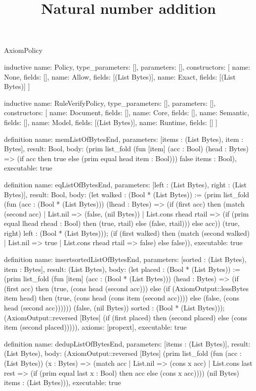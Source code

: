 \begin{lexlean}{AxiomPolicy}
\title{Natural number addition}
\begin{semanticmodule}
inductive{
  name: Policy,
  type_parameters: [],
  parameters: [],
  constructors: [
    {name: None, fields: []},
    {name: Allow, fields: [(List Bytes)]},
    {name: Exact, fields: [(List Bytes)]}
  ]
}

inductive{
  name: RuleVerifyPolicy,
  type_parameters: [],
  parameters: [],
  constructors: [
    {name: Document, fields: []},
    {name: Core, fields: []},
    {name: Semantic, fields: []},
    {name: Model, fields: [(List Bytes)]},
    {name: Runtime, fields: []}
  ]
}

definition{
  name: memListOfBytesEnd,
  parameters: [items : (List Bytes), item : Bytes],
  result: Bool,
  body: (prim list_fold (fun [item] (acc : Bool) (head : Bytes) => (if acc then true else (prim equal head item : Bool))) false items : Bool),
  executable: true
}

definition{
  name: eqListOfBytesEnd,
  parameters: [left : (List Bytes), right : (List Bytes)],
  result: Bool,
  body: (let walked : (Bool * (List Bytes)) := (prim list_fold (fun (acc : (Bool * (List Bytes))) (lhead : Bytes) => (if (first acc) then (match (second acc)
    | List.nil => (false, (nil Bytes))
    | List.cons rhead rtail => (if (prim equal lhead rhead : Bool) then (true, rtail) else (false, rtail))) else acc)) (true, right) left : (Bool * (List Bytes))); (if (first walked) then (match (second walked)
    | List.nil => true
    | List.cons rhead rtail => false) else false)),
  executable: true
}

definition{
  name: insertsortedListOfBytesEnd,
  parameters: [sorted : (List Bytes), item : Bytes],
  result: (List Bytes),
  body: (let placed : (Bool * (List Bytes)) := (prim list_fold (fun [item] (acc : (Bool * (List Bytes))) (head : Bytes) => (if (first acc) then (true, (cons head (second acc))) else (if (AxiomOutput::lessBytes item head) then (true, (cons head (cons item (second acc)))) else (false, (cons head (second acc)))))) (false, (nil Bytes)) sorted : (Bool * (List Bytes))); (AxiomOutput::reversed [Bytes] (if (first placed) then (second placed) else (cons item (second placed))))),
  axioms: [propext],
  executable: true
}

definition{
  name: dedupListOfBytesEnd,
  parameters: [items : (List Bytes)],
  result: (List Bytes),
  body: (AxiomOutput::reversed [Bytes] (prim list_fold (fun (acc : (List Bytes)) (x : Bytes) => (match acc
    | List.nil => (cons x acc)
    | List.cons last rest => (if (prim equal last x : Bool) then acc else (cons x acc)))) (nil Bytes) items : (List Bytes))),
  executable: true
}


\end{semanticmodule}
\end{lexlean}
